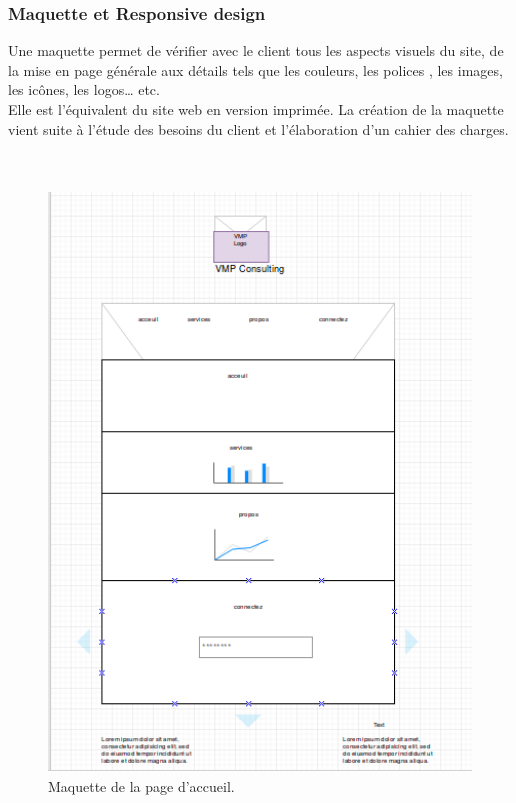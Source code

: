 \documentclass[12pt]{article}
\begin{document}
\subsubsection{Maquette et Responsive design}

Une maquette permet de vérifier avec le client tous les aspects visuels du site, de la mise en page générale aux détails tels que les couleurs, les polices , les images, les icônes, les logos… etc.\\
Elle est l’équivalent du site web en version imprimée. La création de la maquette vient suite à l’étude des besoins du client et l’élaboration d’un cahier des charges.\\

 \\
\\


\begin{center}
\begin{figure}[htp]
  \centering
  \includegraphics[width=12cm]{mod2.png}
  \caption{Maquette de la page d'accueil.}
  \label{fig:une-autre-image}
\end{figure}

\end{center}
\end{document}

